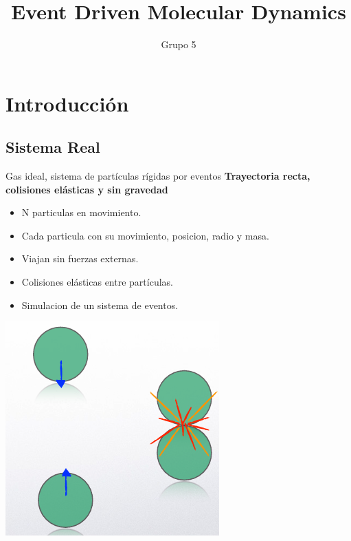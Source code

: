 \documentclass{beamer}
\title{Event Driven Molecular Dynamics}
\author{Grupo 5}
\institute{ITBA}
\date{} %
\begin{document}
\begin{frame}
  \titlepage
\end{frame}

\section{Introducción}
\subsection{Sistema Real}
\begin{frame}{Gas ideal, sistema de partículas rígidas por eventos}
  \textbf{Trayectoria recta, colisiones elásticas y sin gravedad}
  \vspace{0.5cm}
  \begin{itemize}
    \item N particulas en movimiento.
    \item Cada particula con su movimiento, posicion, radio y masa.
    \item Viajan sin fuerzas externas.
    \item Colisiones elásticas entre partículas.
    \item Simulacion de un sistema de eventos.
  \end{itemize}
  \begin{center}
    \includegraphics[width=0.3\linewidth]{photoMaterial/eventos_sistema_real.png}
  \end{center}
\end{frame}
\end{document}
